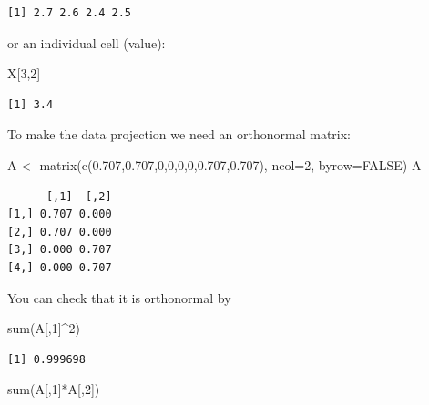 \documentclass[
  letterpaper,
]{krantz}
\newenvironment{Shaded}{\begin{snugshade}}{\end{snugshade}}
\newcommand{\AttributeTok}[1]{\textcolor[rgb]{0.40,0.45,0.13}{#1}}
\newcommand{\ConstantTok}[1]{\textcolor[rgb]{0.56,0.35,0.01}{#1}}
\newcommand{\DecValTok}[1]{\textcolor[rgb]{0.68,0.00,0.00}{#1}}
\newcommand{\FloatTok}[1]{\textcolor[rgb]{0.68,0.00,0.00}{#1}}
\newcommand{\FunctionTok}[1]{\textcolor[rgb]{0.28,0.35,0.67}{#1}}
\newcommand{\NormalTok}[1]{\textcolor[rgb]{0.00,0.23,0.31}{#1}}
\newcommand{\OtherTok}[1]{\textcolor[rgb]{0.00,0.23,0.31}{#1}}
\newcommand{\SpecialCharTok}[1]{\textcolor[rgb]{0.37,0.37,0.37}{#1}}
\begin{document}
\begin{verbatim}
[1] 2.7 2.6 2.4 2.5
\end{verbatim}

or an individual cell (value):

\begin{Shaded}
\begin{Highlighting}[]
\NormalTok{X[}\DecValTok{3}\NormalTok{,}\DecValTok{2}\NormalTok{]}
\end{Highlighting}
\end{Shaded}

\begin{verbatim}
[1] 3.4
\end{verbatim}

To make the data projection we need an orthonormal matrix:

\begin{Shaded}
\begin{Highlighting}[]
\NormalTok{A }\OtherTok{\textless{}{-}} \FunctionTok{matrix}\NormalTok{(}\FunctionTok{c}\NormalTok{(}\FloatTok{0.707}\NormalTok{,}\FloatTok{0.707}\NormalTok{,}\DecValTok{0}\NormalTok{,}\DecValTok{0}\NormalTok{,}\DecValTok{0}\NormalTok{,}\DecValTok{0}\NormalTok{,}\FloatTok{0.707}\NormalTok{,}\FloatTok{0.707}\NormalTok{), }\AttributeTok{ncol=}\DecValTok{2}\NormalTok{, }\AttributeTok{byrow=}\ConstantTok{FALSE}\NormalTok{)}
\NormalTok{A}
\end{Highlighting}
\end{Shaded}

\begin{verbatim}
      [,1]  [,2]
[1,] 0.707 0.000
[2,] 0.707 0.000
[3,] 0.000 0.707
[4,] 0.000 0.707
\end{verbatim}

You can check that it is orthonormal by

\begin{Shaded}
\begin{Highlighting}[]
\FunctionTok{sum}\NormalTok{(A[,}\DecValTok{1}\NormalTok{]}\SpecialCharTok{\^{}}\DecValTok{2}\NormalTok{)}
\end{Highlighting}
\end{Shaded}

\begin{verbatim}
[1] 0.999698
\end{verbatim}

\begin{Shaded}
\begin{Highlighting}[]
\FunctionTok{sum}\NormalTok{(A[,}\DecValTok{1}\NormalTok{]}\SpecialCharTok{*}\NormalTok{A[,}\DecValTok{2}\NormalTok{])}
\end{Highlighting}
\end{Shaded}
\end{document}
